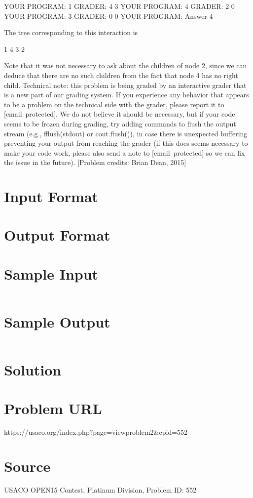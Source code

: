 \documentclass[12pt]{article}
\begin{document}
YOUR PROGRAM: 1
GRADER: 4 3
YOUR PROGRAM: 4
GRADER: 2 0
YOUR PROGRAM: 3
GRADER: 0 0
YOUR PROGRAM: Answer 4

The tree corresponding to this interaction is

     1
   4   3
 2

Note that it was not necessary to ask about the children of node 2, since we
can deduce that there are no such children from the fact that node 4 has no
right child.
Technical note: this problem is being graded by an interactive
grader that is a new part of our grading system.  If you experience
any behavior that appears to be a problem on the technical side with
the grader, please report it to [email protected].  We do not believe
it should be necessary, but if your code seems to be frozen during
grading, try adding commands to flush the output stream (e.g.,
fflush(stdout) or cout.flush()), in case there is unexpected buffering
preventing your output from reaching the grader (if this does seems
necessary to make your code work, please also send a note to
[email protected] so we can fix the issue in the future).
[Problem credits: Brian Dean, 2015]



\section*{Input Format}


\section*{Output Format}


\section*{Sample Input}
\begin{verbatim}

\end{verbatim}

\section*{Sample Output}
\begin{verbatim}

\end{verbatim}

\section*{Solution}


\section*{Problem URL}
https://usaco.org/index.php?page=viewproblem2&cpid=552

\section*{Source}
USACO OPEN15 Contest, Platinum Division, Problem ID: 552
\end{document}
